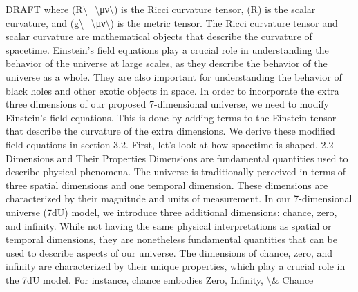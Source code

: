 \documentclass[12pt]{article}
\begin{document}
DRAFT
where (R\textbackslash{}_\textbackslash{}{μν\textbackslash{}}) is the Ricci curvature tensor, (R) is the scalar curvature, and (g\textbackslash{}_\textbackslash{}{μν\textbackslash{}}) is
the metric tensor. The Ricci curvature tensor and scalar curvature are mathematical
objects that describe the curvature of spacetime.
Einstein's ﬁeld equations play a crucial role in understanding the behavior of the
universe at large scales, as they describe the behavior of the universe as a whole.
They are also important for understanding the behavior of black holes and other
exotic objects in space.
In order to incorporate the extra three dimensions of our proposed 7-dimensional
universe, we need to modify Einstein's ﬁeld equations. This is done by adding terms
to the Einstein tensor that describe the curvature of the extra dimensions. We derive
these modiﬁed ﬁeld equations in section 3.2. First, let's look at how spacetime is
shaped.
2.2 Dimensions and Their Properties
Dimensions are fundamental quantities used to describe physical phenomena. The
universe is traditionally perceived in terms of three spatial dimensions and one
temporal dimension. These dimensions are characterized by their magnitude and units
of measurement.
In our 7-dimensional universe (7dU) model, we introduce three additional dimensions:
chance, zero, and inﬁnity. While not having the same physical interpretations as spatial
or temporal dimensions, they are nonetheless fundamental quantities that can be used
to describe aspects of our universe.
The dimensions of chance, zero, and inﬁnity are characterized by their unique
properties, which play a crucial role in the 7dU model. For instance, chance embodies
Zero, Infinity, \textbackslash{}& Chance
\end{document}
